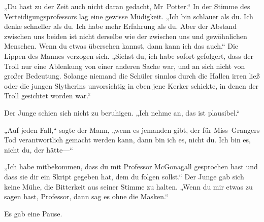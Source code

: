 „Du hast zu der Zeit auch nicht daran gedacht, Mr~Potter.“
In der Stimme des Verteidigungsprofessors lag eine gewisse Müdigkeit.
„Ich bin schlauer als du. Ich denke schneller als du. Ich habe mehr Erfahrung als du. Aber der Abstand zwischen uns beiden ist nicht derselbe wie der zwischen uns und gewöhnlichen Menschen. Wenn du etwas übersehen kannst, dann kann ich das auch.“ Die Lippen des Mannes verzogen sich. „Siehst du, ich habe sofort gefolgert, dass der Troll nur eine Ablenkung von einer anderen Sache war, und an sich nicht von großer Bedeutung. Solange niemand die Schüler sinnlos durch die Hallen irren ließ oder die jungen Slytherins unvorsichtig in eben jene Kerker schickte, in denen der Troll gesichtet worden war.“

Der Junge schien sich nicht zu beruhigen.
„Ich nehme an, das ist plausibel.“

„Auf jeden Fall,“ sagte der Mann, „wenn es jemanden gibt, der für Miss~Grangers Tod verantwortlich gemacht werden kann, dann bin ich es, nicht du. Ich bin es, nicht du, der hätte—“

„Ich habe mitbekommen, dass du mit Professor McGonagall gesprochen hast und dass sie dir ein Skript gegeben hat, dem du folgen sollst.“
Der Junge gab sich keine Mühe, die Bitterkeit aus seiner Stimme zu halten.
„Wenn du mir etwas zu sagen hast, Professor, dann sag es ohne die Masken.“

Es gab eine Pause.

